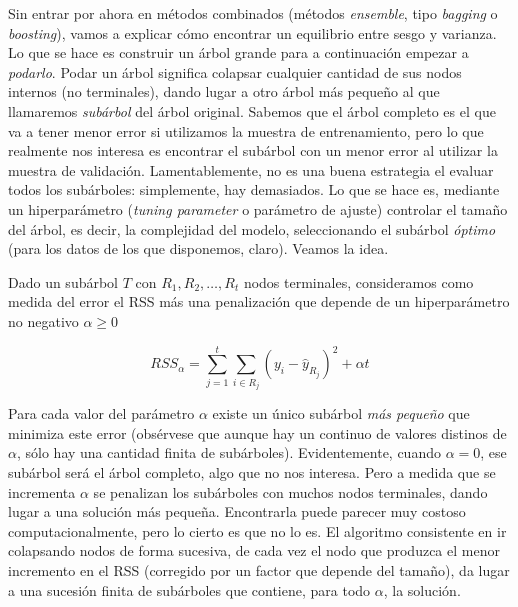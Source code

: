\documentclass[
  spanish,
]{book}
\theoremstyle{break}
\theoremstyle{definition}
\theoremstyle{definition}
\theoremstyle{definition}
\theoremstyle{definition}
\theoremstyle{remark}
\begin{document}
Sin entrar por ahora en métodos combinados (métodos \emph{ensemble}, tipo \emph{bagging} o \emph{boosting}),
vamos a explicar cómo encontrar un equilibrio entre sesgo y varianza. Lo que se hace es
construir un árbol grande para a continuación empezar a \emph{podarlo}. Podar un árbol significa
colapsar cualquier cantidad de sus nodos internos (no terminales), dando lugar a otro árbol más
pequeño al que llamaremos \emph{subárbol} del árbol original. Sabemos que el árbol completo es
el que va a tener menor error si utilizamos la muestra de entrenamiento, pero lo que
realmente nos interesa es encontrar el subárbol con un menor error al utilizar la muestra
de validación. Lamentablemente, no es una buena estrategia el evaluar todos los subárboles:
simplemente, hay demasiados. Lo que se hace es, mediante un
hiperparámetro (\emph{tuning parameter} o parámetro de ajuste) controlar el tamaño del árbol,
es decir, la complejidad del modelo, seleccionando el subárbol \emph{óptimo} (para los datos
de los que disponemos, claro). Veamos la idea.

Dado un subárbol \(T\) con \(R_1, R_2, \ldots, R_t\) nodos terminales, consideramos como
medida del error el RSS más una penalización que depende de un hiperparámetro
no negativo \(\alpha \ge 0\)

\begin{equation} 
RSS_{\alpha} = \sum_{j=1}^t \sum_{i\in R_j} (y_i - \widehat y_{R_j})^2 + \alpha t
\label{eq:rss-alpha}
\end{equation}

Para cada valor del parámetro \(\alpha\) existe un único subárbol \emph{más pequeño}
que minimiza este error (obsérvese que aunque hay un continuo de valores
distinos de \(\alpha\), sólo hay una cantidad finita de subárboles).
Evidentemente, cuando \(\alpha = 0\), ese subárbol será el árbol completo, algo que
no nos interesa. Pero a medida que se incrementa \(\alpha\) se penalizan los subárboles
con muchos nodos terminales, dando lugar a una solución más pequeña.
Encontrarla puede parecer muy costoso computacionalmente, pero lo
cierto es que no lo es. El algoritmo consistente en ir colapsando nodos de forma
sucesiva, de cada vez el nodo que produzca el menor incremento en el RSS (corregido por
un factor que depende del tamaño), da
lugar a una sucesión finita de subárboles que contiene, para todo \(\alpha\), la
solución.
\end{document}
